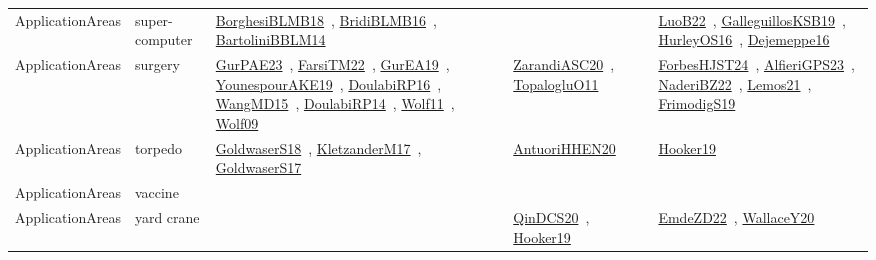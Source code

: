 {\begin{longtable}{lp{3cm}>{\raggedright\arraybackslash}p{6cm}>{\raggedright\arraybackslash}p{6cm}>{\raggedright\arraybackslash}p{8cm}}
ApplicationAreas & super-computer & \href{works/BorghesiBLMB18.pdf}{BorghesiBLMB18}~\cite{BorghesiBLMB18}, \href{works/BridiBLMB16.pdf}{BridiBLMB16}~\cite{BridiBLMB16}, \href{works/BartoliniBBLM14.pdf}{BartoliniBBLM14}~\cite{BartoliniBBLM14} &  & \href{works/LuoB22.pdf}{LuoB22}~\cite{LuoB22}, \href{works/GalleguillosKSB19.pdf}{GalleguillosKSB19}~\cite{GalleguillosKSB19}, \href{works/HurleyOS16.pdf}{HurleyOS16}~\cite{HurleyOS16}, \href{works/Dejemeppe16.pdf}{Dejemeppe16}~\cite{Dejemeppe16}\\
ApplicationAreas & surgery & \href{works/GurPAE23.pdf}{GurPAE23}~\cite{GurPAE23}, \href{works/FarsiTM22.pdf}{FarsiTM22}~\cite{FarsiTM22}, \href{works/GurEA19.pdf}{GurEA19}~\cite{GurEA19}, \href{works/YounespourAKE19.pdf}{YounespourAKE19}~\cite{YounespourAKE19}, \href{works/DoulabiRP16.pdf}{DoulabiRP16}~\cite{DoulabiRP16}, \href{works/WangMD15.pdf}{WangMD15}~\cite{WangMD15}, \href{works/DoulabiRP14.pdf}{DoulabiRP14}~\cite{DoulabiRP14}, \href{works/Wolf11.pdf}{Wolf11}~\cite{Wolf11}, \href{works/Wolf09.pdf}{Wolf09}~\cite{Wolf09} & \href{works/ZarandiASC20.pdf}{ZarandiASC20}~\cite{ZarandiASC20}, \href{works/TopalogluO11.pdf}{TopalogluO11}~\cite{TopalogluO11} & \href{works/ForbesHJST24.pdf}{ForbesHJST24}~\cite{ForbesHJST24}, \href{works/AlfieriGPS23.pdf}{AlfieriGPS23}~\cite{AlfieriGPS23}, \href{works/NaderiBZ22.pdf}{NaderiBZ22}~\cite{NaderiBZ22}, \href{works/Lemos21.pdf}{Lemos21}~\cite{Lemos21}, \href{works/FrimodigS19.pdf}{FrimodigS19}~\cite{FrimodigS19}\\
ApplicationAreas & torpedo & \href{works/GoldwaserS18.pdf}{GoldwaserS18}~\cite{GoldwaserS18}, \href{works/KletzanderM17.pdf}{KletzanderM17}~\cite{KletzanderM17}, \href{works/GoldwaserS17.pdf}{GoldwaserS17}~\cite{GoldwaserS17} & \href{works/AntuoriHHEN20.pdf}{AntuoriHHEN20}~\cite{AntuoriHHEN20} & \href{works/Hooker19.pdf}{Hooker19}~\cite{Hooker19}\\
ApplicationAreas & vaccine &  &  & \\
ApplicationAreas & yard crane &  & \href{works/QinDCS20.pdf}{QinDCS20}~\cite{QinDCS20}, \href{works/Hooker19.pdf}{Hooker19}~\cite{Hooker19} & \href{works/EmdeZD22.pdf}{EmdeZD22}~\cite{EmdeZD22}, \href{works/WallaceY20.pdf}{WallaceY20}~\cite{WallaceY20}\\
\end{longtable}
}

